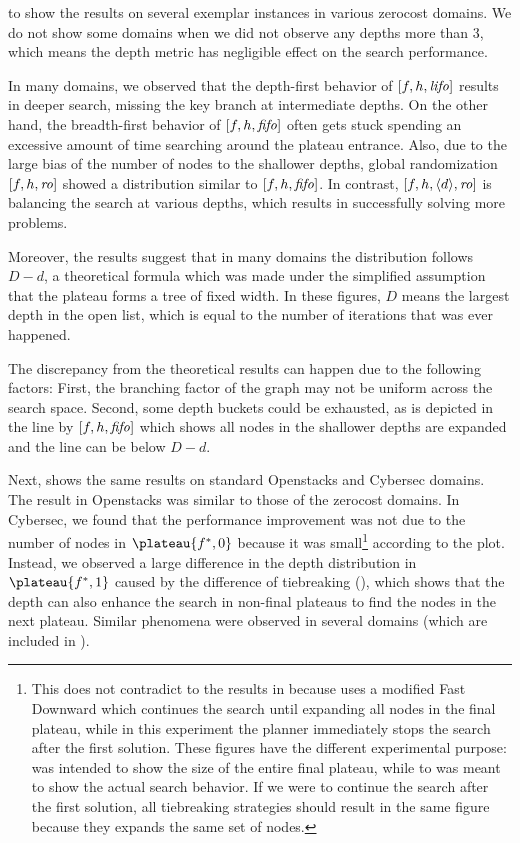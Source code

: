  to  show the results on several exemplar instances in
various zerocost domains.  We do not show some domains when we did not observe any depths more than 3, which means
the depth metric has negligible effect on the search performance.

In many domains, we observed that the depth-first behavior of
$[f,h,{\text{\textit{lifo}}}]$ results in deeper search, missing the key branch at
intermediate depths.  On the other hand, the breadth-first behavior of
$[f,h,{\text{\textit{fifo}}}]$ often gets stuck spending an excessive amount of time
searching around the plateau entrance.  Also, due to the large bias of
the number of nodes to the shallower depths, global randomization
$[f,h,{\text{\textit{ro}}}]$ showed a distribution similar to $[f,h,{\text{\textit{fifo}}}]$.
In contrast, $[f,h,{\left<d\right>},{\text{\textit{ro}}}]$ is balancing the search at various depths, which
results in successfully solving more problems.

Moreover, the results suggest that in many domains the distribution follows
$D-d$, a theoretical formula which was made under the simplified
assumption that the plateau forms a tree of fixed width. In these
figures, $D$ means the largest depth in the open list, which is equal to
the number of iterations that was ever happened.

The discrepancy from the theoretical results can happen due to the
following factors: First, the branching factor of the graph may not be
uniform across the search space. Second, some depth buckets could be
exhausted, as is depicted in the line by $[f,h,{\text{\textit{fifo}}}]$ which
shows all nodes in the shallower depths are expanded and the line can be below $D-d$.

Next,  shows the same results on standard
Openstacks and Cybersec domains.
The result in Openstacks was similar to those of the zerocost domains.
In Cybersec,
we found that the performance improvement was not due to the number of nodes in $\plateau{f^*,0}$ because it was small\footnote{This does not contradict to the results in  because  uses a modified Fast Downward which continues the search until expanding all nodes in the final plateau, while in this experiment the planner immediately stops the search after the first solution. These figures have the different experimental purpose:  was intended to show the size of the entire final plateau, while  to  was meant to show the actual search behavior. If we were to continue the search after the first solution, all tiebreaking strategies should result in the same figure because they expands the same set of nodes.} according to the plot.
Instead, we observed a large difference in the depth distribution in $\plateau{f^*,1}$ caused by the difference of tiebreaking (), which shows that the depth can also enhance the search in non-final plateaus to find the nodes in the next plateau.
Similar phenomena were observed in several domains (which are included in ).


